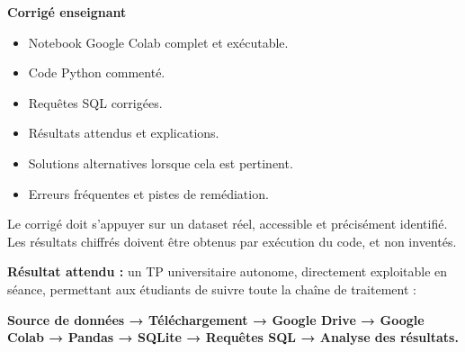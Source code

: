 \documentclass[
]{article}
\providecommand{\tightlist}{%
  \setlength{\itemsep}{0pt}\setlength{\parskip}{0pt}}
\begin{document}
\textbf{Corrigé enseignant}

\begin{itemize}
\tightlist
\item
  Notebook Google Colab complet et exécutable.
\item
  Code Python commenté.
\item
  Requêtes SQL corrigées.
\item
  Résultats attendus et explications.
\item
  Solutions alternatives lorsque cela est pertinent.
\item
  Erreurs fréquentes et pistes de remédiation.
\end{itemize}

Le corrigé doit s'appuyer sur un dataset réel, accessible et précisément
identifié. Les résultats chiffrés doivent être obtenus par exécution du
code, et non inventés.

\textbf{Résultat attendu :} un TP universitaire autonome, directement
exploitable en séance, permettant aux étudiants de suivre toute la
chaîne de traitement :

\textbf{Source de données → Téléchargement → Google Drive → Google Colab
→ Pandas → SQLite → Requêtes SQL → Analyse des résultats.}
\end{document}

